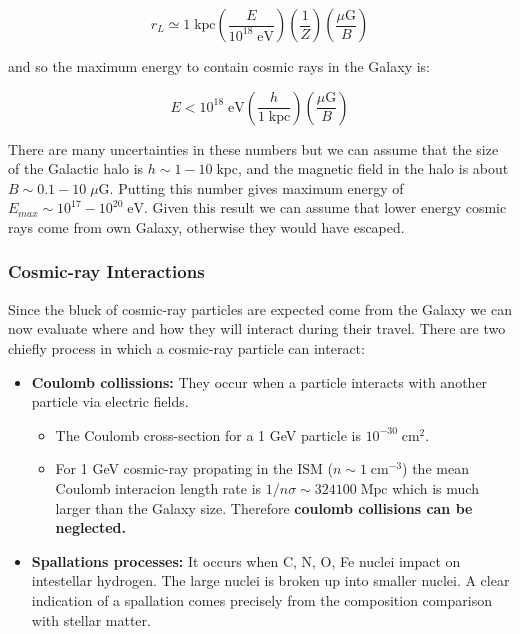 \documentclass[
  letterpaper,
  DIV=11,
  numbers=noendperiod]{scrreprt}
\providecommand{\tightlist}{%
  \setlength{\itemsep}{0pt}\setlength{\parskip}{0pt}}\usepackage{longtable,booktabs,array}
\begin{document}
\[r_L \simeq  1 \;\mathrm{kpc} \left(\frac{E}{10^{18}\;\mathrm{eV}}\right)\left(\frac{1}{Z}\right)\left(\frac{\mu\mathrm{G}}{B}\right)\]

and so the maximum energy to contain cosmic rays in the Galaxy is:

\[E < 10^{18}\;\mathrm{eV} \left(\frac{h}{1\;\mathrm{kpc}}\right)\left(\frac{\mu\mathrm{G}}{B}\right)\]

There are many uncertainties in these numbers but we can assume that the
size of the Galactic halo is \(h \sim 1 - 10\; \mathrm{kpc}\), and the
magnetic field in the halo is about \(B \sim 0.1 - 10 \;\mu\mathrm{G}\).
Putting this number gives maximum energy of
\(E_{max} \sim 10^{17} - 10^{20} \;\mathrm{eV}\). Given this result we
can assume that lower energy cosmic rays come from own Galaxy, otherwise
they would have escaped.

\subsubsection{Cosmic-ray Interactions}\label{cosmic-ray-interactions}

Since the bluck of cosmic-ray particles are expected come from the
Galaxy we can now evaluate where and how they will interact during their
travel. There are two chiefly process in which a cosmic-ray particle can
interact:

\begin{itemize}
\tightlist
\item
  \textbf{Coulomb collissions:} They occur when a particle interacts
  with another particle via electric fields.

  \begin{itemize}
  \tightlist
  \item
    The Coulomb cross-section for a 1 GeV particle is
    \(10^{-30} \; \mathrm{cm}^2\).
  \item
    For 1 GeV cosmic-ray propating in the ISM
    (\(n \sim 1 \; \mathrm{cm}^{-3}\)) the mean Coulomb interacion
    length rate is \(1/n\sigma \sim 324100 \; \mathrm{Mpc}\) which is
    much larger than the Galaxy size. Therefore \textbf{coulomb
    collisions can be neglected.}
  \end{itemize}
\item
  \textbf{Spallations processes:} It occurs when C, N, O, Fe nuclei
  impact on intestellar hydrogen. The large nuclei is broken up into
  smaller nuclei. A clear indication of a spallation comes precisely
  from the composition comparison with stellar matter.
\end{itemize}
\end{document}
